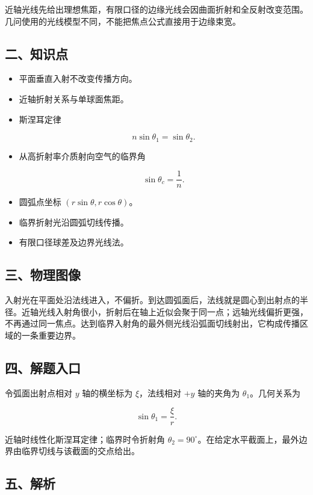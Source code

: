 \documentclass[12pt,a4paper,UTF8]{ctexart}
\begin{document}
近轴光线先给出理想焦距，有限口径的边缘光线会因曲面折射和全反射改变范围。几问使用的光线模型不同，不能把焦点公式直接用于边缘束宽。

\subsection{二、知识点}\label{ux4e8cux77e5ux8bc6ux70b9-6}

\begin{itemize}
\item
  平面垂直入射不改变传播方向。
\item
  近轴折射关系与单球面焦距。
\item
  斯涅耳定律

  \[n\sin\theta_1=\sin\theta_2.\]
\item
  从高折射率介质射向空气的临界角

  \[\sin\theta_c=\frac1n.\]
\item
  圆弧点坐标 \((r\sin\theta,r\cos\theta)\)。
\item
  临界折射光沿圆弧切线传播。
\item
  有限口径球差及边界光线法。
\end{itemize}

\subsection{三、物理图像}\label{ux4e09ux7269ux7406ux56feux50cf-6}

入射光在平面处沿法线进入，不偏折。到达圆弧面后，法线就是圆心到出射点的半径。近轴光线入射角很小，折射后在轴上近似会聚于同一点；远轴光线偏折更强，不再通过同一焦点。达到临界入射角的最外侧光线沿弧面切线射出，它构成传播区域的一条重要边界。

\subsection{四、解题入口}\label{ux56dbux89e3ux9898ux5165ux53e3-6}

令弧面出射点相对 \(y\) 轴的横坐标为 \(\xi\)，法线相对 \(+y\) 轴的夹角为
\(\theta_1\)。几何关系为

\[
\sin\theta_1=\frac\xi r.
\]

近轴时线性化斯涅耳定律；临界时令折射角
\(\theta_2=90^\circ\)。在给定水平截面上，最外边界由临界切线与该截面的交点给出。

\subsection{五、解析}\label{ux4e94ux89e3ux6790-6}
\end{document}
